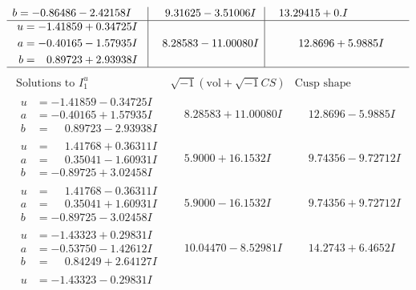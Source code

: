\documentclass[1p]{elsarticle_modified}
\theoremstyle{definition}
\newcommand{\I}{\sqrt{-1}}
\begin{document}
$$\begin{array}{c|c|c}
\begin{aligned}
b &= -0.86486 - 2.42158 I\end{aligned}
 & \phantom{-}9.31625 - 3.51006 I & \phantom{-}13.29415 + 0. I\phantom{ +0.000000I} \\ \hline\begin{aligned}
u &= -1.41859 + 0.34725 I \\
a &= -0.40165 - 1.57935 I \\
b &= \phantom{-}0.89723 + 2.93938 I\end{aligned}
 & \phantom{-}8.28583 - 11.00080 I & \phantom{-}12.8696 + 5.9885 I\\
 \hline 
 \end{array}$$\newpage$$\begin{array}{c|c|c}  
\text{Solutions to }I^u_{1}& \I (\text{vol} + \sqrt{-1}CS) & \text{Cusp shape}\\
 \hline 
\begin{aligned}
u &= -1.41859 - 0.34725 I \\
a &= -0.40165 + 1.57935 I \\
b &= \phantom{-}0.89723 - 2.93938 I\end{aligned}
 & \phantom{-}8.28583 + 11.00080 I & \phantom{-}12.8696 - 5.9885 I \\ \hline\begin{aligned}
u &= \phantom{-}1.41768 + 0.36311 I \\
a &= \phantom{-}0.35041 - 1.60931 I \\
b &= -0.89725 + 3.02458 I\end{aligned}
 & \phantom{-}5.9000 + 16.1532 I & \phantom{-}9.74356 - 9.72712 I \\ \hline\begin{aligned}
u &= \phantom{-}1.41768 - 0.36311 I \\
a &= \phantom{-}0.35041 + 1.60931 I \\
b &= -0.89725 - 3.02458 I\end{aligned}
 & \phantom{-}5.9000 - 16.1532 I & \phantom{-}9.74356 + 9.72712 I \\ \hline\begin{aligned}
u &= -1.43323 + 0.29831 I \\
a &= -0.53750 - 1.42612 I \\
b &= \phantom{-}0.84249 + 2.64127 I\end{aligned}
 & \phantom{-}10.04470 - 8.52981 I & \phantom{-}14.2743 + 6.4652 I \\ \hline\begin{aligned}
u &= -1.43323 - 0.29831 I \\

\end{aligned}
\end{array}$$
\end{document}
